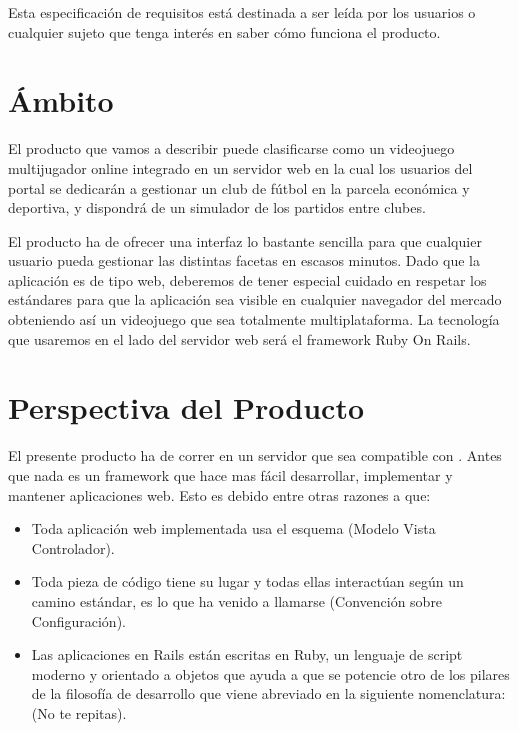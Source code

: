 Esta especificación de requisitos está destinada a ser leída por los usuarios o
cualquier sujeto que tenga interés en saber cómo funciona el producto.

\section{Ámbito}
El producto que vamos a describir puede clasificarse como un videojuego
multijugador online integrado en un servidor web en la cual los usuarios del
portal se dedicarán a gestionar un club de fútbol en la parcela económica y
deportiva, y dispondrá de un simulador de los partidos entre clubes.

El producto ha de ofrecer una interfaz lo bastante sencilla para que cualquier
usuario pueda gestionar las distintas facetas en escasos minutos. Dado que la
aplicación es de tipo web, deberemos de tener especial cuidado en respetar los
estándares para que la aplicación sea visible en cualquier navegador del mercado
obteniendo así un videojuego que sea totalmente multiplataforma. La tecnología
que usaremos en el lado del servidor web será el framework Ruby On Rails.

\section{Perspectiva del Producto}
El presente producto ha de correr en un servidor que sea compatible con
. Antes que nada  es un
framework que hace mas fácil desarrollar, implementar y mantener aplicaciones
web. Esto es debido entre otras razones a que:

\begin{itemize}
\item Toda aplicación web implementada usa el esquema  (Modelo Vista
  Controlador).
  
\item Toda pieza de código tiene su lugar y todas ellas interactúan según un
  camino estándar, es lo que ha venido a llamarse  (Convención sobre
  Configuración).
  
\item Las aplicaciones en Rails están escritas en Ruby, un lenguaje de script
  moderno y orientado a objetos que ayuda a que se potencie otro de los pilares
  de la filosofía de desarrollo que viene abreviado en la siguiente
  nomenclatura:  (No te repitas).
\end{itemize}

